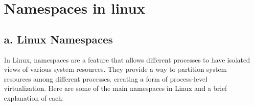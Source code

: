\documentclass{report}
\begin{document}
\chapter*{Namespaces in linux}

\section*{a. Linux Namespaces}

In Linux, namespaces are a feature that allows different processes to have isolated views of various system resources.
They provide a way to partition system resources among different processes, creating a form of process-level virtualization.
Here are some of the main namespaces in Linux and a brief explanation of each:
\end{document}
